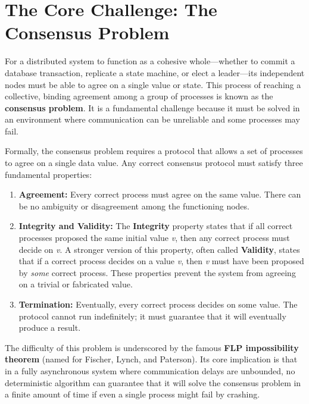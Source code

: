 \documentclass{scrbook}
\begin{document}
\section{The Core Challenge: The Consensus Problem}

For a distributed system to function as a cohesive whole---whether to
commit a database transaction, replicate a state machine, or elect a
leader---its independent nodes must be able to agree on a single value
or state. This process of reaching a collective, binding agreement among
a group of processes is known as the \textbf{consensus problem}. It is a
fundamental challenge because it must be solved in an environment where
communication can be unreliable and some processes may fail.

Formally, the consensus problem requires a protocol that allows a set of
processes to agree on a single data value. Any correct consensus
protocol must satisfy three fundamental properties:

\begin{enumerate}
\item
  \textbf{Agreement:} Every correct process must agree on the same
  value. There can be no ambiguity or disagreement among the functioning
  nodes.
\item
  \textbf{Integrity and Validity:} The \textbf{Integrity} property
  states that if all correct processes proposed the same initial value
  \emph{v}, then any correct process must decide on \emph{v}. A stronger
  version of this property, often called \textbf{Validity}, states that
  if a correct process decides on a value \emph{v}, then \emph{v} must
  have been proposed by \emph{some} correct process. These properties
  prevent the system from agreeing on a trivial or fabricated value.
\item
  \textbf{Termination:} Eventually, every correct process decides on
  some value. The protocol cannot run indefinitely; it must guarantee
  that it will eventually produce a result.
\end{enumerate}

The difficulty of this problem is underscored by the famous \textbf{FLP
impossibility theorem} (named for Fischer, Lynch, and Paterson). Its
core implication is that in a fully asynchronous system where
communication delays are unbounded, no deterministic algorithm can
guarantee that it will solve the consensus problem in a finite amount of
time if even a single process might fail by crashing. \\
\end{document}
